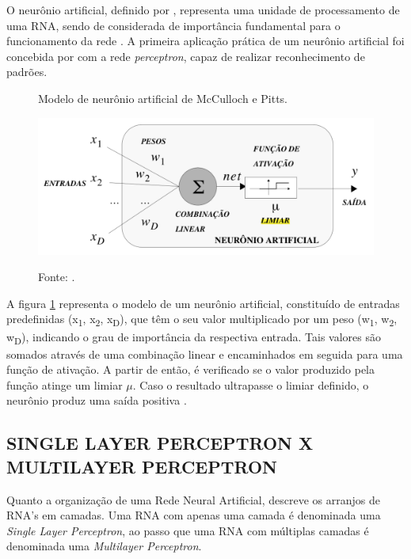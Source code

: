 O neurônio artificial, definido por , representa uma unidade de processamento de uma RNA, sendo de considerada de importância fundamental para o funcionamento da rede \cite{haykin2007redes}. A primeira aplicação prática de um neurônio artificial foi concebida por  com a rede \textit{perceptron}, capaz de realizar reconhecimento de padrões.

\begin{figure}[H]
	\caption{Modelo de neurônio artificial de McCulloch e Pitts.}
	\centering %
	\includegraphics[width=14cm]{resources/modelo_neuronio.png} %
	\label{figura:modelo_neuronio}
	\caption*{Fonte: .}
\end{figure}

A figura \ref{figura:modelo_neuronio} representa o modelo de um neurônio artificial, constituído de entradas predefinidas (x\textsubscript{1}, x\textsubscript{2}, x\textsubscript{D}), que têm o seu valor multiplicado por um peso (w\textsubscript{1}, w\textsubscript{2}, w\textsubscript{D}), indicando o grau de importância da respectiva entrada. Tais valores são somados através de uma combinação linear e encaminhados em seguida para uma função de ativação. A partir de então, é verificado se o valor produzido pela função atinge um limiar \(\mu\). Caso o resultado ultrapasse o limiar definido, o neurônio produz uma saída positiva \cite{thomas2019}.

\subsection{SINGLE LAYER PERCEPTRON X MULTILAYER PERCEPTRON}

Quanto a organização de uma Rede Neural Artificial,  descreve os arranjos de RNA's em camadas. Uma RNA com apenas uma camada é denominada uma \textit{Single Layer Perceptron}, ao passo que uma RNA com múltiplas camadas é denominada uma \textit{Multilayer Perceptron}.

